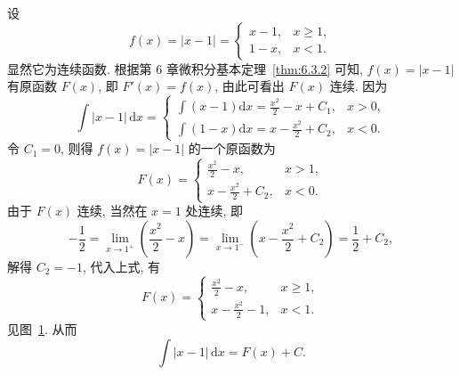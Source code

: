 \begin{solution}
设
\[
f(x)=|x-1|=
\begin{cases}
x-1, & x\geqslant 1,\\
1-x, & x<1.
\end{cases}
\]
显然它为连续函数. 根据第 6 章微积分基本定理~\ref{thm:6.3.2} 可知, $f(x)=|x-1|$ 有原函数 $F(x)$, 即 $F'(x)=f(x)$, 由此可看出 $F(x)$ 连续. 因为
\[
\int|x-1|\,\mathrm{d}x=
\begin{cases}
\displaystyle\int(x-1)\mathrm{d}x=\frac{x^{2}}{2}-x+C_{1}, & x>0,\\[2mm]
\displaystyle\int(1-x)\mathrm{d}x=x-\frac{x^{2}}{2}+C_{2}, & x<0.
\end{cases}
\]
令 $C_{1}=0$, 则得 $f(x)=|x-1|$ 的一个原函数为
\[
F(x)=
\begin{cases}
\frac{x^{2}}{2}-x, & x>1,\\[2mm]
x-\frac{x^{2}}{2}+C_{2}, & x<0.
\end{cases}
\]
由于 $F(x)$ 连续, 当然在 $x=1$ 处连续, 即
\[
-\frac{1}{2}=\lim_{x\to1^{+}}\left(\frac{x^{2}}{2}-x\right)
=\lim_{x\to1^{-}}\left(x-\frac{x^{2}}{2}+C_{2}\right)=\frac{1}{2}+C_{2},
\]
解得 $C_{2}=-1$, 代入上式, 有
\[
F(x)=
\begin{cases}
\frac{x^{2}}{2}-x, & x\geqslant 1,\\[2mm]
x-\frac{x^{2}}{2}-1, & x<1.
\end{cases}
\]
见图~\ref{fig:5.1.3}. 从而
\[
\int|x-1|\,\mathrm{d}x=F(x)+C.
\]
\end{solution}

\begin{figure}[htbp]
\centering
{}
\caption{}\label{fig:5.1.3}
\end{figure}

